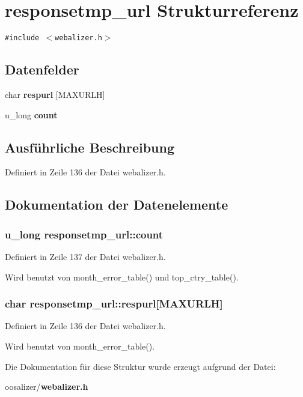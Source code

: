 \section{responsetmp\_\-url Strukturreferenz}
\label{structresponsetmp__url}
{\tt \#include $<$webalizer.h$>$}

\subsection*{Datenfelder}
\begin{CompactItemize}
\item 
char {\bf respurl} [MAXURLH]
\item 
u\_\-long {\bf count}
\end{CompactItemize}


\subsection{Ausf\"{u}hrliche Beschreibung}




Definiert in Zeile 136 der Datei webalizer.h.

\subsection{Dokumentation der Datenelemente}
\subsubsection{\setlength{\rightskip}{0pt plus 5cm}u\_\-long {\bf responsetmp\_\-url::count}}\label{structresponsetmp__url_3fadce0607dd50b5b522cecb148a3e3a}




Definiert in Zeile 137 der Datei webalizer.h.

Wird benutzt von month\_\-error\_\-table() und top\_\-ctry\_\-table().
\subsubsection{\setlength{\rightskip}{0pt plus 5cm}char {\bf responsetmp\_\-url::respurl}[MAXURLH]}\label{structresponsetmp__url_b4ad044e588e562efd1346b8f43c5384}




Definiert in Zeile 136 der Datei webalizer.h.

Wird benutzt von month\_\-error\_\-table().

Die Dokumentation f\"{u}r diese Struktur wurde erzeugt aufgrund der Datei:\begin{CompactItemize}
\item 
oosalizer/{\bf webalizer.h}\end{CompactItemize}
